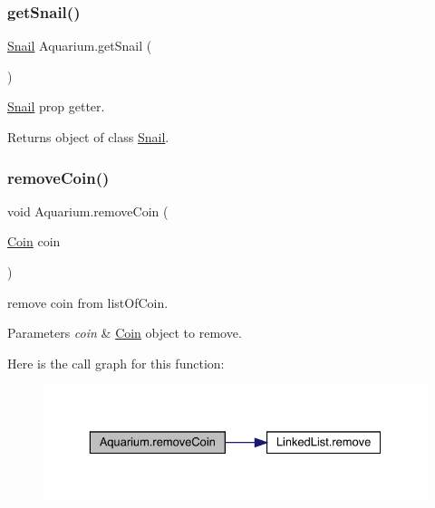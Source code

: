 \subsubsection{\texorpdfstring{get\+Snail()}{getSnail()}}
{\footnotesize\ttfamily \mbox{\hyperlink{class_snail}{Snail}} Aquarium.\+get\+Snail (\begin{DoxyParamCaption}{ }\end{DoxyParamCaption})\hspace{0.3cm}{\ttfamily [inline]}}

\mbox{\hyperlink{class_snail}{Snail}} prop getter. \begin{DoxyReturn}{Returns}
object of class \mbox{\hyperlink{class_snail}{Snail}}. 
\end{DoxyReturn}
\mbox{\label{class_aquarium_af6f2d1079224c08a0ff7d376ea04c732}} 
\subsubsection{\texorpdfstring{remove\+Coin()}{removeCoin()}}
{\footnotesize\ttfamily void Aquarium.\+remove\+Coin (\begin{DoxyParamCaption}\item[{\mbox{\hyperlink{class_coin}{Coin}}}]{coin }\end{DoxyParamCaption})\hspace{0.3cm}{\ttfamily [inline]}}

remove coin from list\+Of\+Coin. 
\begin{DoxyParams}{Parameters}
{\em coin} & \mbox{\hyperlink{class_coin}{Coin}} object to remove. \\
\hline
\end{DoxyParams}
Here is the call graph for this function\+:
\nopagebreak
\begin{figure}[H]
\begin{center}
\leavevmode
\includegraphics[width=329pt]{class_aquarium_af6f2d1079224c08a0ff7d376ea04c732_cgraph}
\end{center}
\end{figure}
\mbox{\label{class_aquarium_a6c1a0d6a0cc7cd4604dfce22706f57ca}} 

